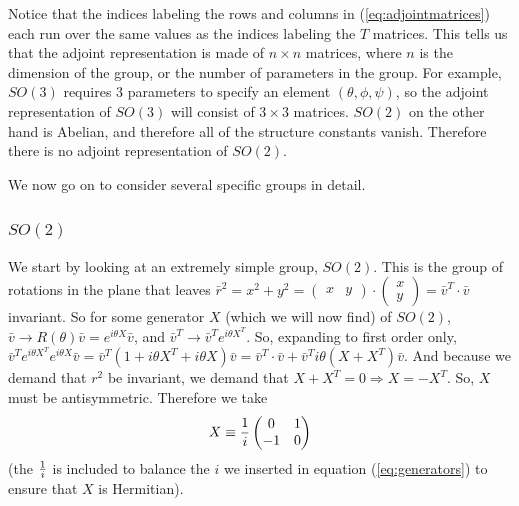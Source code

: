 \documentclass[12pt,epsf]{article}
\def\nolabel{\nonumber }
\def\nolabel{\nonumber }
\begin{document}
Notice that the indices labeling the rows and columns in
(\ref{eq:adjointmatrices}) each run over the same values as the indices
labeling the $T$ matrices.  This tells us that the adjoint
representation is made of $n\times n$ matrices, where $n$ is the
dimension of the group, or the number of parameters in the group.  For
example, $SO(3)$ requires 3 parameters to specify an element
$(\theta,\phi,\psi)$, so the adjoint representation of $SO(3)$ will
consist of $3\times3$ matrices.  $SO(2)$ on the other hand is Abelian,
and therefore all of the structure constants vanish.  Therefore there
is no adjoint representation of $SO(2)$.  

We now go on to consider several specific groups in detail.  

\subsubsection{$SO(2)$}

We start by looking at an extremely simple group, $SO(2)$.  This is the
group of rotations in the plane that leaves $\bar r^2 = x^2+y^2 = 
\begin{pmatrix}
x & y
\end{pmatrix}\cdot 
\begin{pmatrix}
x \\ y
\end{pmatrix} = \bar v^T \cdot \bar v$ invariant.  So for some
generator $X$ (which we will now find) of $SO(2)$, $\bar v \rightarrow
R(\theta)\bar v = e^{i\theta X}\bar v$, and $\bar v^T \rightarrow \bar
v^Te^{i\theta X^T}$.  So, expanding to first order only, $\bar v^T
e^{i\theta X^T}e^{i\theta X}\bar v = \bar v^T(1+i\theta X^T + i\theta
X)\bar v = \bar v^T \cdot \bar v + \bar v^T i\theta (X+X^T) \bar v$. 
And because we demand that $r^2$ be invariant, we demand that $X+X^T =
0 \Rightarrow X=-X^T$.	So, $X$ must be antisymmetric.	Therefore we
take
\begin{eqnarray}
X \equiv {1\over i}
\begin{pmatrix}
0 & 1 \\ -1 & 0
\end{pmatrix}\nolabel 
\end{eqnarray}
(the ${1\over i}$ is included to balance the $i$ we inserted in
equation (\ref{eq:generators}) to ensure that $X$ is Hermitian).  
\end{document}
